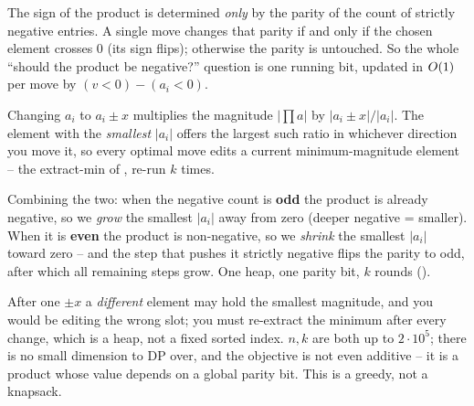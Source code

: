 \begin{observation}
The sign of the product is determined \emph{only} by the parity of the count of strictly negative entries.
A single move changes that parity if and only if the chosen element crosses $0$ (its sign flips);
otherwise the parity is untouched. So the whole ``should the product be negative?'' question is one running
bit, updated in $O(1)$ per move by $(v<0)-(a_i<0)$.
\end{observation}
\begin{observation}
Changing $a_i$ to $a_i\pm x$ multiplies the magnitude $|{\textstyle\prod}a|$ by $|a_i\pm x|/|a_i|$. The
element with the \emph{smallest} $|a_i|$ offers the largest such ratio in whichever direction you move it,
so every optimal move edits a current minimum-magnitude element -- the extract-min of ,
re-run $k$ times.
\end{observation}
\begin{observation}
Combining the two: when the negative count is \textbf{odd} the product is already negative, so we
\emph{grow} the smallest $|a_i|$ away from zero (deeper negative = smaller). When it is \textbf{even} the
product is non-negative, so we \emph{shrink} the smallest $|a_i|$ toward zero -- and the step that pushes it
strictly negative flips the parity to odd, after which all remaining steps grow. One heap, one parity bit,
$k$ rounds ().
\end{observation}

\begin{thinkbox}
{After one $\pm x$ a \emph{different} element may hold the smallest magnitude, and you would be editing the
wrong slot; you must re-extract the minimum after every change, which is a heap, not a fixed sorted index.}
{$n,k$ are both up to $2\cdot10^{5}$; there is no small dimension to DP over, and the objective is not even
additive -- it is a product whose value depends on a global parity bit. This is a greedy, not a knapsack.}
\end{thinkbox}

